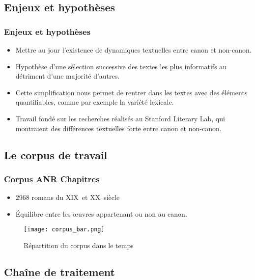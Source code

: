 \documentclass{beamer}
\begin{document}
\subsection{Enjeux et hypothèses}

\begin{frame}
\frametitle{Enjeux et hypothèses}
\begin{itemize}
\item Mettre au jour l'existence de dynamiques textuelles entre canon et non-canon.
\item Hypothèse d'une sélection successive des textes les plus informatifs au détriment d'une majorité d'autres.
\item Cette simplification nous permet de rentrer dans les textes avec des éléments quantifiables, comme par exemple la variété lexicale.
\item Travail fondé sur les recherches réalisés au Stanford Literary Lab, qui montraient des différences textuelles forte entre canon et non-canon\cite{p5}.
\end{itemize}



\end{frame}

\subsection{Le corpus de travail}

\begin{frame}
\frametitle{Corpus ANR Chapitres}
\begin{itemize}
\item 2968 romans du \textsc{XIX}\ieme ~et \textsc{XX}\ieme ~siècle
\item Équilibre entre les œuvres appartenant ou non au canon.
\end{itemize}
\begin{figure}
    \centering
    \texttt{[image: corpus\_bar.png]}
    \caption{Répartition du corpus dans le temps}
    \label{corpus_bar}
\end{figure}
\end{frame}

\subsection{Chaîne de traitement}
\end{document}
